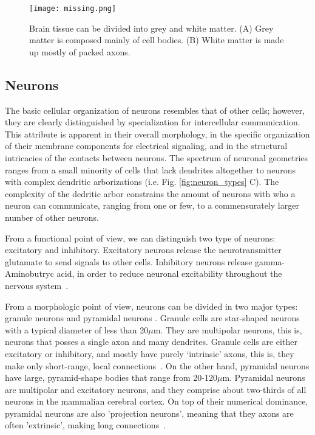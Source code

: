 \begin{figure}[h!]
    \texttt{[image: missing.png]}
    \caption{Brain tissue can be divided into grey and white matter. (A) Grey matter
             is composed mainly of cell bodies. (B) White matter is made up mostly
             of packed axons.}
    \label{fig:white_grey_matter}
\end{figure}
% 

\subsection{Neurons}

The basic cellular organization of neurons resembles that of other cells; however,
they are clearly distinguished by specialization for intercellular communication.
This attribute is apparent in their overall morphology, in the specific
organization of their membrane components for electrical signaling, and in the
structural intricacies of the contacts between neurons. The spectrum of neuronal
geometries ranges from a small minority of cells that lack dendrites altogether
to neurons with complex dendritic arborizations (i.e. Fig. \ref{fig:neuron_types} C).
The complexity of the dedritic arbor constrains the amount of neurons with who
a neuron can communicate, ranging from one or few, to a commensurately larger
number of other neurons.

From a functional point of view, we can distinguish two type of neurons:
excitatory and inhibitory. Excitatory neurons release the neurotransmitter
glutamate to send signals to other cells. Inhibitory neurons release
gamma-Aminobutryc acid, in order to reduce neuronal excitability throughout
the nervous system~\cite{Bekkers2011}.

From a morphologic point of view, neurons can be divided in two major types:
granule neurons and pyramidal neurons \cite{Purves2004}. Granule cells are 
star-shaped neurons with a typical diameter of less than 20$\mu$m. They are
multipolar neurons, this is, neurons that posses a single axon and many dendrites.
Granule cells are either excitatory or inhibitory, and mostly have purely
‘intrinsic’ axons, this is, they make only short-range, local connections~\cite{Purves2004}.
On the other hand, pyramidal neurons have large, pyramid-shape bodies that
range from 20-120$\mu$m. Pyramidal neurons are multipolar and excitatory neurons,
and they comprise about two-thirds of all neurons in the mammalian cerebral cortex.
On top of their numerical dominance, pyramidal neurons are also 'projection neurons',
meaning that they axons are often 'extrinsic', making long connections~\cite{Purves2004}.

